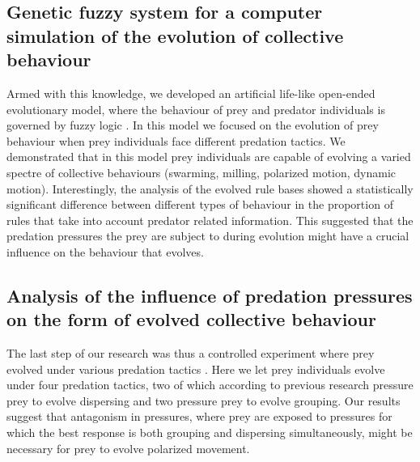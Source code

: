 \subsection*{Genetic fuzzy system for a computer simulation of the evolution of collective behaviour} Armed with this knowledge, we developed an artificial life-like open-ended evolutionary model, where the behaviour of prey and predator individuals is governed by fuzzy logic \cite{demsar2017evolution}. In this model we focused on the evolution of prey behaviour when prey individuals face different predation tactics. We demonstrated that in this model prey individuals are capable of evolving a varied spectre of collective behaviours (swarming, milling, polarized motion, dynamic motion). Interestingly, the analysis of the evolved rule bases showed a statistically significant difference between different types of behaviour in the proportion of rules that take into account predator related information. This suggested that the predation pressures the prey are subject to during evolution might have a crucial influence on the behaviour that evolves.

\subsection*{Analysis of the influence of predation pressures on the form of evolved collective behaviour} The last step of our research was thus a controlled experiment where prey evolved under various predation tactics \cite{demsar2016balanced}. Here we let prey individuals evolve under four predation tactics, two of which according to previous research pressure prey to evolve dispersing and two pressure prey to evolve grouping. Our results suggest that antagonism in pressures, where prey are exposed to pressures for which the best response is both grouping and dispersing simultaneously, might be necessary for prey to evolve polarized movement.
